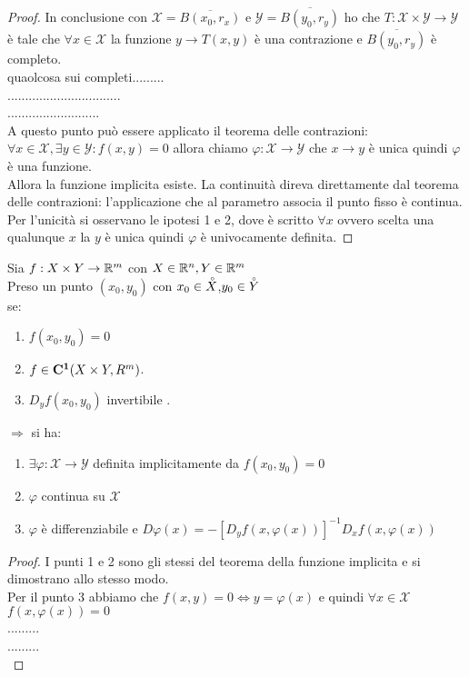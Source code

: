 \begin{theorem}
\begin{proof}
		In conclusione con $\mathcal{X}=\overline{B(x_0,r_x)}$ e $\mathcal{Y}=\overline{B(y_0,r_y)}$ ho che $T:\mathcal{X}\times\mathcal{Y}\rightarrow\mathcal{Y}$ è tale che $\forall x\in\mathcal{X}$ la funzione $y\rightarrow T(x,y)$ è una contrazione e $\overline{B(y_0,r_y)}$ è completo.\\
		quaolcosa sui completi.........\\
		................................\\
		..........................\\
		A questo punto può essere applicato il teorema delle contrazioni:\\
		$\forall x \in \mathcal{X}, \exists y \in\mathcal{Y}: f(x,y)=0$ allora chiamo $\varphi:\mathcal{X}\rightarrow\mathcal{Y}$ che $x\rightarrow y$ è unica quindi $\varphi$ è una funzione.\\
		Allora la funzione implicita esiste. La continuità direva direttamente dal teorema delle contrazioni: l'applicazione che al parametro associa il punto fisso è continua.\\
		Per l'unicità si osservano le ipotesi 1 e 2, dove è scritto $\forall x$ ovvero scelta una qualunque $x$ la $y$ è unica quindi $\varphi$ è univocamente definita.
		
	\end{proof}
\end{theorem}
\proposition
Sia $f:X\times Y\rightarrow \mathbb{R}^m$ con $X\in \mathbb{R}^n, Y\in \mathbb{R}^m$\\
Preso un punto $(x_0,y_0)$ con $x_0\in \accentset{\circ}{X}$,$y_0\in \accentset{\circ}{Y}$\\
se:
\begin{enumerate}
	\item $f(x_0,y_0)=0$
	\item $f\in \mathbf{C^{1}}(X\times Y,R^m)$.
	\item $D_yf(x_0,y_0)$ invertibile .
\end{enumerate}
$\Rightarrow $ si ha:\\
\begin{enumerate}
	\item $\exists \varphi: \mathcal{X}\rightarrow\mathcal{Y}$ definita implicitamente da $f(x_0,y_0)=0$
	\item $\varphi$ continua su $\mathcal{X}$
	\item $\varphi$ è differenziabile e $D\varphi(x)=-[D_yf(x,\varphi(x))]^{-1}D_xf(x,\varphi(x))$
\end{enumerate}
\begin{proof}
	I punti 1 e 2 sono gli stessi del teorema della funzione implicita e si dimostrano allo stesso modo.\\
	Per il punto 3 abbiamo che $f(x,y)=0\Leftrightarrow y=\varphi(x)$ e quindi $\forall x\in \mathcal{X}$ $f(x,\varphi(x))=0$\\
	.........\\
	.........\\
	
\end{proof}


